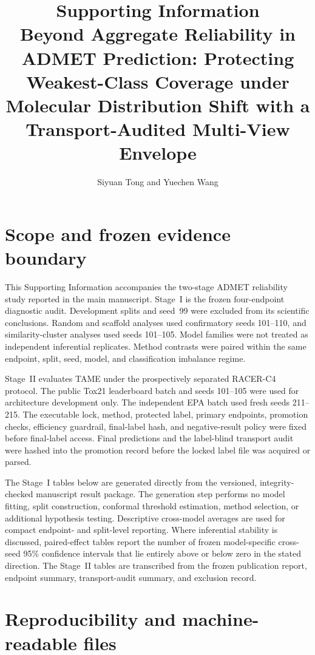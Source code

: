 \documentclass[10pt]{article}
\title{Supporting Information\\[0.5em]
\large Beyond Aggregate Reliability in ADMET Prediction: Protecting Weakest-Class Coverage under Molecular Distribution Shift with a Transport-Audited Multi-View Envelope}
\author{Siyuan Tong and Yuechen Wang}
\date{}
\begin{document}
\maketitle

\section{Scope and frozen evidence boundary}

This Supporting Information accompanies the two-stage ADMET reliability study reported in the main manuscript. Stage~I is the frozen four-endpoint diagnostic audit. Development splits and seed~99 were excluded from its scientific conclusions. Random and scaffold analyses used confirmatory seeds 101--110, and similarity-cluster analyses used seeds 101--105. Model families were not treated as independent inferential replicates. Method contrasts were paired within the same endpoint, split, seed, model, and classification imbalance regime.

Stage~II evaluates TAME under the prospectively separated RACER-C4 protocol. The public Tox21 leaderboard batch and seeds 101--105 were used for architecture development only. The independent EPA batch used fresh seeds 211--215. The executable lock, method, protected label, primary endpoints, promotion checks, efficiency guardrail, final-label hash, and negative-result policy were fixed before final-label access. Final predictions and the label-blind transport audit were hashed into the promotion record before the locked label file was acquired or parsed.

The Stage~I tables below are generated directly from the versioned, integrity-checked manuscript result package. The generation step performs no model fitting, split construction, conformal threshold estimation, method selection, or additional hypothesis testing. Descriptive cross-model averages are used for compact endpoint- and split-level reporting. Where inferential stability is discussed, paired-effect tables report the number of frozen model-specific cross-seed 95\% confidence intervals that lie entirely above or below zero in the stated direction. The Stage~II tables are transcribed from the frozen publication report, endpoint summary, transport-audit summary, and exclusion record.

\section{Reproducibility and machine-readable files}
\end{document}
